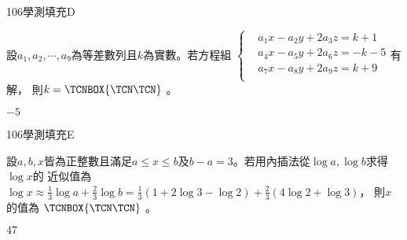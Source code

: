     \begin{QUESTION}
        \begin{ExamInfo}{106}{學測}{填充}{D}
        \end{ExamInfo}
        \begin{ExamAnsRateInfo}{37}{70}{33}{8}
        \end{ExamAnsRateInfo}
        \begin{QBODY}
            設${{a}_{1}},{{a}_{2}},\cdots ,{{a}_{9}}$為等差數列且$k$為實數。若方程組
			$\left\{ \begin{aligned}
			& {{a}_{1}}x-{{a}_{2}}y+2{{a}_{3}}z=k+1 \\ 
			& {{a}_{4}}x-{{a}_{5}}y+2{{a}_{6}}z=-k-5 \\ 
			& {{a}_{7}}x-{{a}_{8}}y+2{{a}_{9}}z=k+9 \\ 
			\end{aligned} \right.$有解，
			則$k=\TCNBOX{\TCN\TCN}$      。
        \end{QBODY}
        \begin{QFROMS}
        \end{QFROMS}
        \begin{QTAGS}\end{QTAGS}
        \begin{QANS}
            $-5$
        \end{QANS}
        \begin{QSOLLIST}
        \end{QSOLLIST}
        \begin{QEMPTYSPACE}
        \end{QEMPTYSPACE}
    \end{QUESTION}
    \begin{QUESTION}
        \begin{ExamInfo}{106}{學測}{填充}{E}
        \end{ExamInfo}
        \begin{ExamAnsRateInfo}{24}{59}{12}{1}
        \end{ExamAnsRateInfo}
        \begin{QBODY}
            設$a,b,x$皆為正整數且滿足$a\le x\le b$及$b-a=3$。若用內插法從$\log a,\log b$求得$\log x$的
			近似值為
			$\log x\approx \frac{1}{3}\log a+\frac{2}{3}\log b=\frac{1}{3}(1+2\log 3-\log 2)+\frac{2}{3}(4\log 2+\log 3)$，
			則$x$的值為 $\TCNBOX{\TCN\TCN}$        。
        \end{QBODY}
        \begin{QFROMS}
        \end{QFROMS}
        \begin{QTAGS}\end{QTAGS}
        \begin{QANS}
            $47$
        \end{QANS}
        \begin{QSOLLIST}
        \end{QSOLLIST}
        \begin{QEMPTYSPACE}
        \end{QEMPTYSPACE}
    \end{QUESTION}
